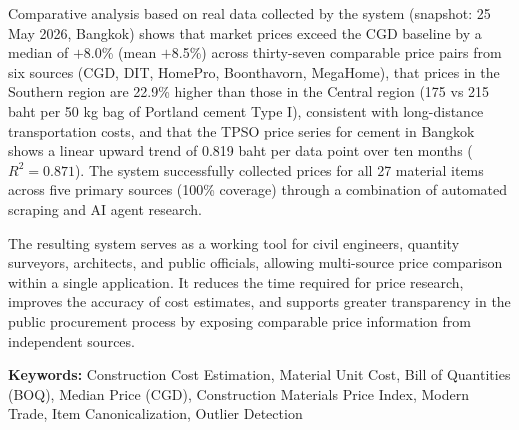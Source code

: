 Comparative analysis based on real data collected by the system
(snapshot: 25 May 2026, Bangkok) shows that market prices exceed the CGD
baseline by a median of $+$8.0\% (mean $+$8.5\%) across thirty-seven comparable
price pairs from six sources (CGD, DIT, HomePro, Boonthavorn, MegaHome),
that prices in the Southern region are 22.9\% higher than those in the
Central region (175 vs 215 baht per 50 kg bag of Portland cement Type I),
consistent with long-distance transportation costs, and that the TPSO
price series for cement in Bangkok shows a linear upward trend of 0.819
baht per data point over ten months ($R^{2} = 0.871$). The system
successfully collected prices for all 27 material items across five
primary sources (100\% coverage) through a combination of automated
scraping and AI agent research.

The resulting system serves as a working tool for civil engineers,
quantity surveyors, architects, and public officials, allowing
multi-source price comparison within a single application. It reduces
the time required for price research, improves the accuracy of cost
estimates, and supports greater transparency in the public procurement
process by exposing comparable price information from independent
sources.

\noindent\textbf{Keywords:} Construction Cost Estimation,
Material Unit Cost, Bill of Quantities (BOQ), Median Price (CGD),
Construction Materials Price Index, Modern Trade, Item Canonicalization,
Outlier Detection
\newpage
